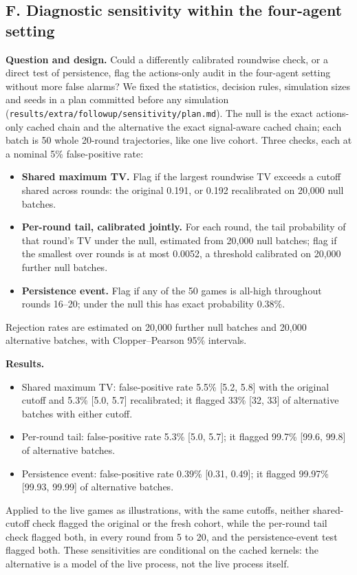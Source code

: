 \documentclass[11pt,letterpaper]{article}
\begin{document}
\subsection{F. Diagnostic sensitivity within the four-agent setting}

\textbf{Question and design.}
Could a differently calibrated roundwise check, or a direct test of persistence, flag the actions-only audit in the four-agent setting without more false alarms?
We fixed the statistics, decision rules, simulation sizes and seeds in a plan committed before any simulation (\texttt{results/extra/followup/sensitivity/plan.md}).
The null is the exact actions-only cached chain and the alternative the exact signal-aware cached chain; each batch is 50 whole 20-round trajectories, like one live cohort.
Three checks, each at a nominal 5\% false-positive rate:
\begin{itemize}
  \item \textbf{Shared maximum TV.} Flag if the largest roundwise TV exceeds a cutoff shared across rounds: the original 0.191, or 0.192 recalibrated on 20,000 null batches.
  \item \textbf{Per-round tail, calibrated jointly.} For each round, the tail probability of that round's TV under the null, estimated from 20,000 null batches; flag if the smallest over rounds is at most 0.0052, a threshold calibrated on 20,000 further null batches.
  \item \textbf{Persistence event.} Flag if any of the 50 games is all-high throughout rounds 16--20; under the null this has exact probability 0.38\%.
\end{itemize}
Rejection rates are estimated on 20,000 further null batches and 20,000 alternative batches, with Clopper--Pearson 95\% intervals.

\textbf{Results.}
\begin{itemize}
  \item Shared maximum TV: false-positive rate 5.5\% [5.2, 5.8] with the original cutoff and 5.3\% [5.0, 5.7] recalibrated; it flagged 33\% [32, 33] of alternative batches with either cutoff.
  \item Per-round tail: false-positive rate 5.3\% [5.0, 5.7]; it flagged 99.7\% [99.6, 99.8] of alternative batches.
  \item Persistence event: false-positive rate 0.39\% [0.31, 0.49]; it flagged 99.97\% [99.93, 99.99] of alternative batches.
\end{itemize}
Applied to the live games as illustrations, with the same cutoffs, neither shared-cutoff check flagged the original or the fresh cohort, while the per-round tail check flagged both, in every round from 5 to 20, and the persistence-event test flagged both.
These sensitivities are conditional on the cached kernels: the alternative is a model of the live process, not the live process itself.
\end{document}
